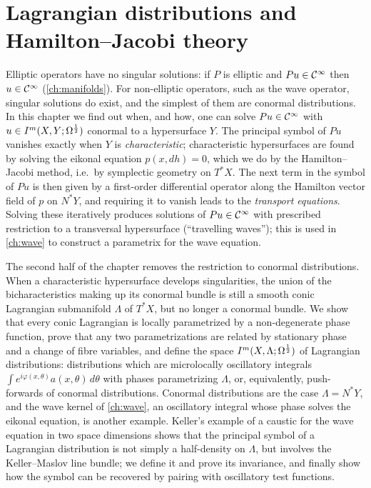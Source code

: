 \chapter{Lagrangian distributions and Hamilton--Jacobi theory}\label{ch:hj}
\providecommand{\osc}[1]{\mathcal{I}[#1]}

Elliptic operators have no singular solutions: if $P$ is elliptic and
$Pu\in\mathcal{C}^\infty$ then $u\in\mathcal{C}^\infty$ (\cref{ch:manifolds}).  For non-elliptic operators,
such as the wave operator, singular solutions do exist, and the simplest of them
are conormal distributions.  In this chapter we find out when, and how, one can
solve $Pu\in\mathcal{C}^\infty$ with $u\in I^{m}(X,Y;\Omega^{\frac12})$ conormal to a hypersurface $Y$.
The principal symbol of $Pu$ vanishes exactly when $Y$ is \emph{characteristic};
characteristic hypersurfaces are found by solving the eikonal equation
$p(x,dh)=0$, which we do by the Hamilton--Jacobi method, i.e.\ by symplectic
geometry on $T^*X$.  The next term in the symbol of $Pu$ is then given by a
first-order differential operator along the Hamilton vector field of $p$ on
$N^*Y$, and requiring it to vanish leads to the \emph{transport equations}.
Solving these iteratively produces solutions of $Pu\in\mathcal{C}^\infty$ with prescribed
restriction to a transversal hypersurface (``travelling waves''); this is used in
\cref{ch:wave} to construct a parametrix for the wave equation.

The second half of the chapter removes the restriction to conormal
distributions.  When a characteristic hypersurface develops singularities, the
union of the bicharacteristics making up its conormal bundle is still a smooth
conic Lagrangian submanifold $\Lambda$ of $T^*X$, but no longer a conormal
bundle.  We show that every conic Lagrangian is locally parametrized by a
non-degenerate phase function, prove that any two parametrizations are related
by stationary phase and a change of fibre variables, and define the space
$I^{m}(X,\Lambda;\Omega^{\frac12})$ of Lagrangian distributions: distributions which
are microlocally oscillatory integrals $\int e^{i\varphi(x,\theta)}
a(x,\theta)\,d\theta$ with phases parametrizing $\Lambda$, or, equivalently,
push-forwards of conormal distributions.  Conormal distributions are the case
$\Lambda=N^*Y$, and the wave kernel of \cref{ch:wave}, an oscillatory integral
whose phase solves the eikonal equation, is another example.  Keller's example
of a caustic for the wave equation in two space dimensions shows that the
principal symbol of a Lagrangian distribution is not simply a half-density on
$\Lambda$, but involves the Keller--Maslov line bundle; we define it and prove
its invariance, and finally show how the symbol can be recovered by pairing
with oscillatory test functions.

